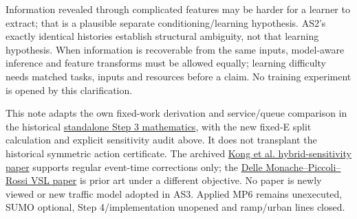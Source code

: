 \documentclass[11pt,a4paper]{article}
\begin{document}
Information revealed through complicated features may be harder for a
learner to extract; that is a plausible separate conditioning/learning
hypothesis. AS2's exactly identical histories establish structural ambiguity,
not that learning hypothesis. When information is recoverable from the same
inputs, model-aware inference and feature transforms must be allowed equally;
learning difficulty needs matched tasks, inputs and resources before a claim.
No training experiment is opened by this clarification.

This note adapts the own fixed-work derivation and service/queue comparison
in the historical
\href{vsl_step3_standalone_information_and_gradient.pdf}{standalone Step 3 mathematics},
with the new fixed-E split calculation and explicit sensitivity audit above.
It does not transplant the historical symmetric action certificate.
The archived \href{https://arxiv.org/pdf/2306.06862}{Kong et al. hybrid-sensitivity paper}
supports regular event-time corrections only; the
\href{https://arxiv.org/pdf/1603.04785}{Delle Monache--Piccoli--Rossi VSL paper}
is prior art under a different objective. No paper is newly viewed or new
traffic model adopted in AS3. Applied MP6 remains unexecuted, SUMO optional,
Step 4/implementation unopened and ramp/urban lines closed.
\end{document}
